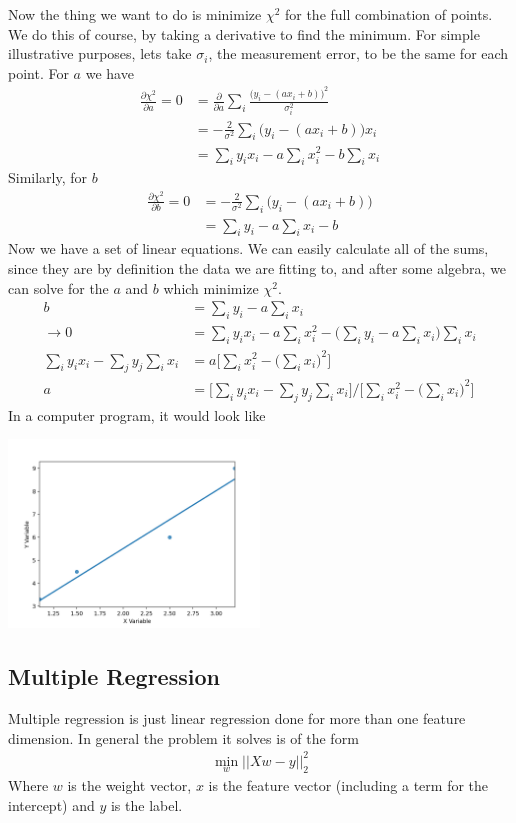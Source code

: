 Now the thing we want to do is minimize $\chi^2$ for the full combination of points. We do this of course, by taking a derivative to find the minimum. For simple illustrative purposes, lets take $\sigma_i$, the measurement error, to be the same for each point. For $a$ we have
\begin{align}
\frac{\partial \chi^2}{\partial a} = 0 &= \frac{\partial}{\partial a} \sum_i \frac{\Big(y_i - (ax_i + b)\Big)^2}{\sigma_i^2} \\
&= - \frac{2}{\sigma^2}\sum_i \Big(y_i - (ax_i+b)\Big)x_i\\
&= \sum_i y_i x_i - a\sum_ix_i^2 - b\sum_i x_i
\end{align}
Similarly, for $b$
\begin{align}
\frac{\partial \chi^2}{\partial b} = 0 &= -\frac{2}{\sigma^2}\sum_i \Big(y_i-(ax_i+b)\Big)\\
&= \sum_i y_i - a \sum_i x_i - b
\end{align}
Now we have a set of linear equations. We can easily calculate all of the sums, since they are by definition the data we are fitting to, and after some algebra, we can solve for the $a$ and $b$ which minimize $\chi^2$.
\begin{align}
b &= \sum_i y_i - a \sum_i x_i\\
\rightarrow 0 &= \sum_i y_i x_i - a\sum_ix_i^2 - \Big(\sum_i y_i - a \sum_i x_i\Big)\sum_i x_i\\
\sum_i y_i x_i  - \sum_j y_j \sum_i x_i &= a\Big[\sum_i x_i^2 -\Big(\sum_i x_i\Big)^2\Big]\\
a &= \Big[\sum_i y_i x_i  - \sum_j y_j \sum_i x_i\Big] /\Big[\sum_i x_i^2 -\Big(\sum_i x_i\Big)^2\Big] 
\end{align}
In a computer program, it would look like




\centerline{\includegraphics[width=0.5\textwidth]{mathematics/fig/linearRegression.png}}


\subsection{Multiple Regression}
Multiple regression is just linear regression done for more than one feature dimension. In general the problem it solves is of the form
\begin{align}
	\min_w||Xw-y||^2_2
\end{align}
Where $w$ is the weight vector, $x$ is the feature vector (including a term for the intercept) and $y$ is the label.

